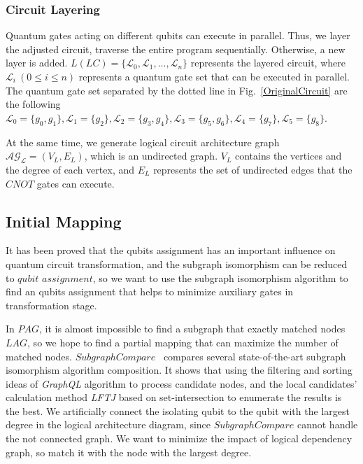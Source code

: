 \documentclass[runningheads]{llncs}
\begin{document}
\subsubsection{Circuit Layering}
Quantum gates acting on different qubits can execute in parallel. Thus, we layer the adjusted circuit, traverse the entire program sequentially. Otherwise, a new layer is added. $L(LC)=\{\mathcal{L}_{0},\mathcal{L}_{1},...,\mathcal{L}_{n}\}$ represents the layered circuit, where $\mathcal{L}_{i} \ (0 \le i \le n) $ represents a quantum gate set that can be executed in parallel. The quantum gate set separated by the dotted line in Fig.~\ref{OriginalCircuit} are the following $\mathcal{L}_{0}=\{g_{0},g_{1}\},\mathcal{L}_{1}=\{g_{2}\},
 \mathcal{L}_{2}=\{g_{3},g_{4}\},\mathcal{L}_{3}=\{g_{5},g_{6}\},\mathcal{L}_{4}=\{g_{7}\},\mathcal{L}_{5}=\{g_{8}\}$.

At the same time, we generate logical circuit architecture graph $\mathcal{AG_{L}}=(V_{L},E_{L})$, which is an undirected graph. $V_{L}$ contains the vertices and the degree of each vertex, and $E_{L}$ represents the set of undirected edges that the $CNOT$ gates can execute.

\subsection{Initial Mapping}
It has been proved that the qubits assignment has an important influence on quantum circuit transformation,  and the subgraph isomorphism can be reduced to $qubit$ $ assignment$, so we want to use the subgraph isomorphism algorithm to find an qubits assignment that helps to minimize auxiliary gates in transformation stage.

In $PAG$, it is almost impossible to find a subgraph that exactly matched nodes $LAG$, so we hope to find a partial mapping that can maximize the number of matched nodes. $SubgraphCompare$~\cite{Sun2020} compares several state-of-the-art subgraph isomorphism algorithm composition. 
It shows that using the filtering and sorting ideas of \emph{GraphQL} algorithm to process candidate nodes, and the local candidates' calculation method \emph{LFTJ} based on set-intersection to enumerate the results is the best. We artiﬁcially connect the isolating qubit to the qubit with the largest degree in the logical architecture diagram, since $SubgraphCompare$ cannot handle the not connected graph. We want to minimize the impact of logical dependency graph, so match it with the node with the largest degree.
\end{document}
